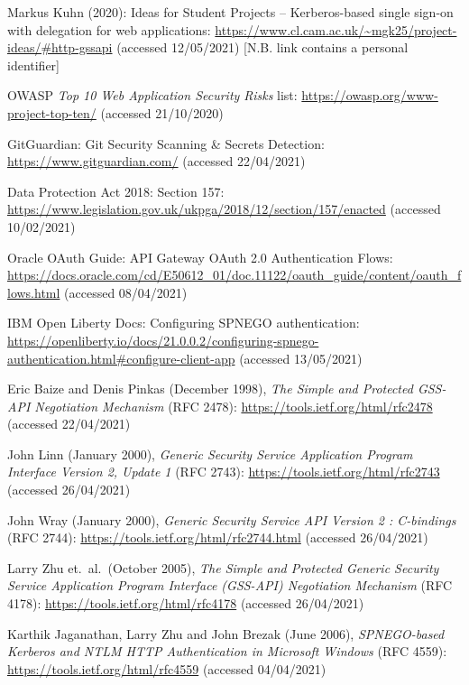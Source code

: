 \documentclass[12pt]{report}
\begin{document}
\begin{thebibliography}{99}
 Markus Kuhn (2020): Ideas for Student Projects -- Kerberos-based single sign-on with delegation for web applications: \url{https://www.cl.cam.ac.uk/~mgk25/project-ideas/#http-gssapi} (accessed 12/05/2021) [N.B. link contains a personal identifier]

 OWASP \textit{Top 10 Web Application Security Risks} list: \url{https://owasp.org/www-project-top-ten/} (accessed 21/10/2020)

 GitGuardian: Git Security Scanning \& Secrets Detection: \url{https://www.gitguardian.com/} (accessed 22/04/2021)

 Data Protection Act 2018: Section 157: \url{https://www.legislation.gov.uk/ukpga/2018/12/section/157/enacted} (accessed 10/02/2021)

 Oracle OAuth Guide: API Gateway OAuth 2.0 Authentication Flows: \url{https://docs.oracle.com/cd/E50612_01/doc.11122/oauth_guide/content/oauth_flows.html} (accessed 08/04/2021)

 IBM Open Liberty Docs: Configuring SPNEGO authentication: \url{https://openliberty.io/docs/21.0.0.2/configuring-spnego-authentication.html#configure-client-app} (accessed 13/05/2021)

 Eric Baize and Denis Pinkas (December 1998), \textit{The Simple and Protected GSS-API Negotiation Mechanism} (RFC 2478): \url{https://tools.ietf.org/html/rfc2478} (accessed 22/04/2021)

 John Linn (January 2000), \textit{Generic Security Service Application Program Interface Version 2, Update 1} (RFC 2743): \url{https://tools.ietf.org/html/rfc2743} (accessed 26/04/2021)

 John Wray (January 2000), \textit{Generic Security Service API Version 2 : C-bindings} (RFC 2744): \url{https://tools.ietf.org/html/rfc2744.html} (accessed 26/04/2021)

 Larry Zhu et.\ al.\ (October 2005), \textit{The Simple and Protected Generic Security Service Application Program Interface (GSS-API) Negotiation Mechanism} (RFC 4178): \url{https://tools.ietf.org/html/rfc4178} (accessed 26/04/2021)

 Karthik Jaganathan, Larry Zhu and John Brezak (June 2006), \textit{SPNEGO-based Kerberos and NTLM HTTP Authentication in Microsoft Windows} (RFC 4559): \url{https://tools.ietf.org/html/rfc4559} (accessed 04/04/2021)


\end{thebibliography}
\end{document}
